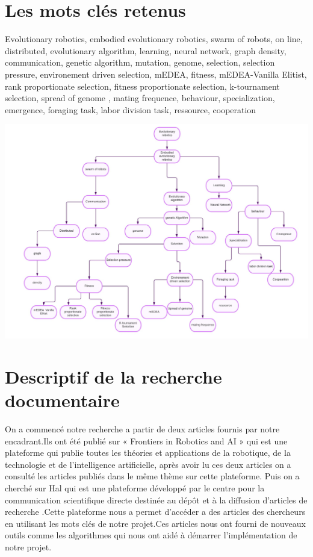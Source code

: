 \documentclass[11pt]{article}
\begin{document}
\section{Les mots clés retenus}
\flushleft
\justify
Evolutionary robotics, embodied evolutionary robotics, swarm of robots, on line, distributed, evolutionary algorithm, learning, neural network, graph  density, communication, genetic algorithm, mutation, genome, selection, selection pressure, environement driven selection, mEDEA, fitness, mEDEA-Vanilla Elitist, rank proportionate selection, fitness proportionate selection, k-tournament selection, spread of genome , mating frequence, behaviour, specialization, emergence, foraging task, labor division task, ressource, cooperation

\flushleft
\includegraphics[scale=0.5]{carte heuristique.jpeg}

\section{Descriptif de la recherche documentaire}
On a commencé notre recherche  a partir de deux articles fournis par notre encadrant.Ils ont été publié sur « Frontiers in Robotics and AI » qui est une plateforme qui publie toutes les  théories et applications de la robotique, de la technologie et de l’intelligence artificielle, après avoir lu ces deux articles on a consulté les articles publiés dans le même thème sur cette plateforme.
   Puis on a cherché  sur Hal qui est une plateforme développé par le centre pour la communication scientifique directe destinée au dépôt et à la diffusion d’articles de recherche .Cette plateforme nous a permet d’accéder a des articles des chercheurs en utilisant les mots clés de notre projet.Ces articles nous ont fourni de nouveaux outils comme les algorithmes qui nous ont aidé à démarrer l’implémentation de notre projet.
\end{document}
